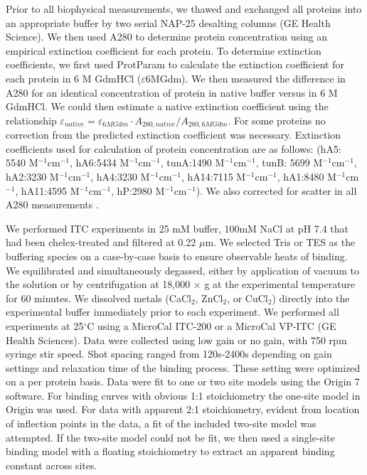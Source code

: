 Prior to all biophysical measurements, we thawed and exchanged all
proteins into an appropriate buffer by two serial NAP-25 desalting
columns (GE Health Science). We then used A280 to determine protein
concentration using an empirical extinction coefficient for each protein.
To determine extinction coefficients, we first used ProtParam \cite{gill_calculation_1989,walker_proteomics_2005}
to calculate the extinction coefficient for each protein in 6 M GdmHCl
($\varepsilon$6MGdm). We then measured the difference in A280 for
an identical concentration of protein in native buffer versus in 6
M GdmHCl. We could then estimate a native extinction coefficient using
the relationship  $\varepsilon_{native}=\varepsilon_{6MGdm}\cdot A_{280,native}/A_{280,6MGdm}$.
For some proteins no correction from the predicted extinction coefficient
was necessary. Extinction coefficients used for calculation of protein
concentration are as follows: (hA5: 5540 M$^{-1}$cm$^{-1}$, hA6:5434
M$^{-1}$cm$^{-1}$, tunA:1490 M$^{-1}$cm$^{-1}$, tunB: 5699 M$^{-1}$cm$^{-1}$,
hA2:3230 M$^{-1}$cm$^{-1}$, hA4:3230 M$^{-1}$cm$^{-1}$, hA14:7115
M$^{-1}$cm$^{-1}$, hA1:8480 M$^{-1}$cm$^{-1}$, hA11:4595 M$^{-1}$cm$^{-1}$,
hP:2980 M$^{-1}$cm$^{-1}$). We also corrected for scatter in all
A280 measurements \cite{birdsall_correction_1983}.


We performed ITC experiments in 25 mM buffer, 100mM NaCl at pH 7.4
that had been chelex-treated and filtered at 0.22 $\mu$m. We selected
Tris or TES as the buffering species on a case-by-case basis to ensure
observable heats of binding. We equilibrated and simultaneously degassed,
either by application of vacuum to the solution or by centrifugation
at 18,000 $\times$ g at the experimental temperature for 60 minutes.
We dissolved metals (CaCl$_{2}$, ZnCl$_{2}$, or CuCl$_{2}$) directly
into the experimental buffer immediately prior to each experiment.
We performed all experiments at 25$^{\circ}$C using a MicroCal ITC-200
or a MicroCal VP-ITC (GE Health Sciences). Data were collected using
low gain or no gain, with 750 rpm syringe stir speed. Shot spacing
ranged from 120s-2400s depending on gain settings and relaxation time
of the binding process. These setting were optimized on a per protein
basis. Data were fit to one or two site models using the Origin 7
software. For binding curves with obvious 1:1 stoichiometry the one-site
model in Origin was used. For data with apparent 2:1 stoichiometry,
evident from location of inflection points in the data, a fit of the
included two-site model was attempted. If the two-site model could
not be fit, we then used a single-site binding model with a floating
stoichiometry to extract an apparent binding constant across sites.

